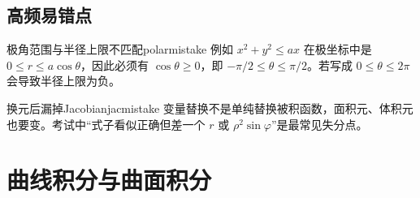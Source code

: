 \documentclass[UTF8,zihao=-4,openany]{ctexbook}
\begin{document}
\section{高频易错点}
\begin{mistake}{极角范围与半径上限不匹配}{polarmistake}
例如 $x^2+y^2\le ax$ 在极坐标中是 $0\le r\le a\cos\theta$，因此必须有 $\cos\theta\ge0$，即 $-\pi/2\le\theta\le\pi/2$。若写成 $0\le\theta\le2\pi$ 会导致半径上限为负。
\end{mistake}
\begin{mistake}{换元后漏掉Jacobian}{jacmistake}
变量替换不是单纯替换被积函数，面积元、体积元也要变。考试中“式子看似正确但差一个 $r$ 或 $\rho^2\sin\varphi$”是最常见失分点。
\end{mistake}

\chapter{曲线积分与曲面积分}
\end{document}
